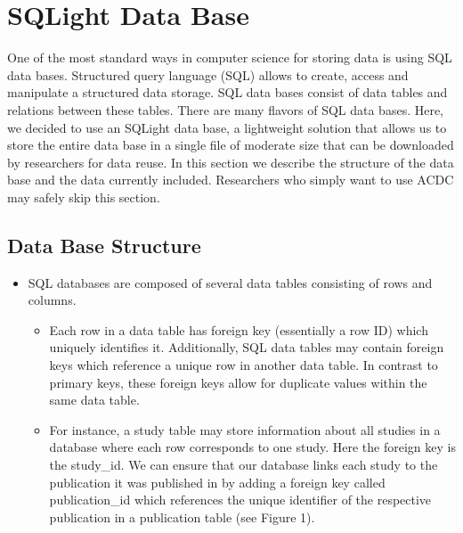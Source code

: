 \documentclass[
  man]{apa6}
\providecommand{\tightlist}{%
  \setlength{\itemsep}{0pt}\setlength{\parskip}{0pt}}
\begin{document}
\hypertarget{sqlight-data-base}{%
\section{SQLight Data Base}\label{sqlight-data-base}}

One of the most standard ways in computer science for storing data is using SQL data bases. Structured query language (SQL) allows to create, access and manipulate a structured data storage. SQL data bases consist of data tables and relations between these tables. There are many flavors of SQL data bases. Here, we decided to use an SQLight data base, a lightweight solution that allows us to store the entire data base in a single file of moderate size that can be downloaded by researchers for data reuse. In this section we describe the structure of the data base and the data currently included. Researchers who simply want to use ACDC may safely skip this section.

\hypertarget{data-base-structure}{%
\subsection{Data Base Structure}\label{data-base-structure}}

\begin{itemize}
\tightlist
\item
  SQL databases are composed of several data tables consisting of rows and columns.

  \begin{itemize}
  \tightlist
  \item
    Each row in a data table has foreign key (essentially a row ID) which uniquely identifies it. Additionally, SQL data tables may contain foreign keys which reference a unique row in another data table. In contrast to primary keys, these foreign keys allow for duplicate values within the same data table.
  \item
    For instance, a study table may store information about all studies in a database where each row corresponds to one study. Here the foreign key is the study\_id. We can ensure that our database links each study to the publication it was published in by adding a foreign key called publication\_id which references the unique identifier of the respective publication in a publication table (see Figure 1).
  \end{itemize}
\end{itemize}
\end{document}
